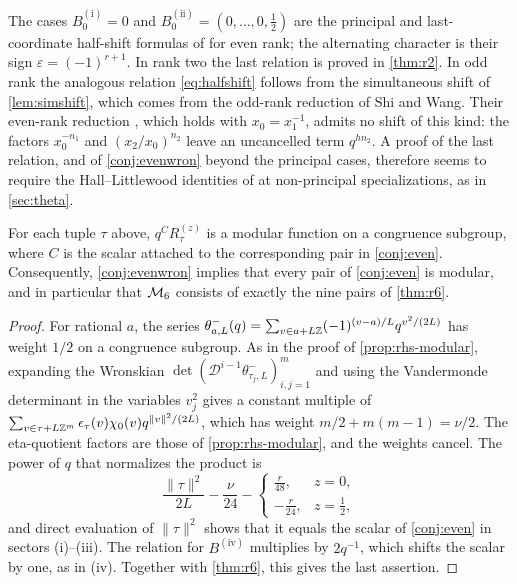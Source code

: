 The cases $B^{\mathrm{(i)}}_0=0$ and $B^{\mathrm{(ii)}}_0=(0,\dots,0,\frac12)$ are the principal and last-coordinate half-shift formulas of \cite{CTW26} for even rank; the alternating character is their sign $\varepsilon=(-1)^{r+1}$. In rank two the last relation is proved in \cref{thm:r2}. In odd rank the analogous relation \eqref{eq:halfshift} follows from the simultaneous shift of \cref{lem:simshift}, which comes from the odd-rank reduction of Shi and Wang. Their even-rank reduction \cite[(1.10)]{SW26}, which holds with $x_0=x_1^{-1}$, admits no shift of this kind: the factors $x_0^{-n_1}$ and $(x_2/x_0)^{n_2}$ leave an uncancelled term $q^{hn_2}$. A proof of the last relation, and of \cref{conj:evenwron} beyond the principal cases, therefore seems to require the Hall--Littlewood identities of \cite{BW15} at non-principal specializations, as in \cref{sec:theta}.

\begin{proposition}\label{prop:evenwron}
For each tuple $\tau$ above, $q^{C}R^{(z)}_\tau$ is a modular function on a congruence subgroup, where $C$ is the scalar attached to the corresponding pair in \cref{conj:even}. Consequently, \cref{conj:evenwron} implies that every pair of \cref{conj:even} is modular, and in particular that $\mathcal{M}_6$ consists of exactly the nine pairs of \cref{thm:r6}.
\end{proposition}

\begin{proof}
For rational $a$, the series $\theta^-_{a,L}(q)=\sum_{v\in a+L\mathbb{Z}}(-1)^{(v-a)/L}q^{v^2/(2L)}$ has weight $1/2$ on a congruence subgroup. As in the proof of \cref{prop:rhs-modular}, expanding the Wronskian $\det(\mathcal D^{i-1}\theta^-_{\tau_j,L})_{i,j=1}^m$ and using the Vandermonde determinant in the variables $v_j^2$ gives a constant multiple of $\sum_{v\in\tau+L\mathbb{Z}^m}\epsilon_\tau(v)\chi_0(v)q^{\|v\|^2/(2L)}$, which has weight $m/2+m(m-1)=\nu/2$. The eta-quotient factors are those of \cref{prop:rhs-modular}, and the weights cancel. The power of $q$ that normalizes the product is
\[
\frac{\|\tau\|^2}{2L}-\frac\nu{24}-\begin{cases}\frac r{48},&z=0,\\[2pt]-\frac r{24},&z=\frac12,\end{cases}
\]
and direct evaluation of $\|\tau\|^2$ shows that it equals the scalar of \cref{conj:even} in sectors (i)--(iii). The relation for $B^{\mathrm{(iv)}}$ multiplies by $2q^{-1}$, which shifts the scalar by one, as in (iv). Together with \cref{thm:r6}, this gives the last assertion.
\end{proof}

